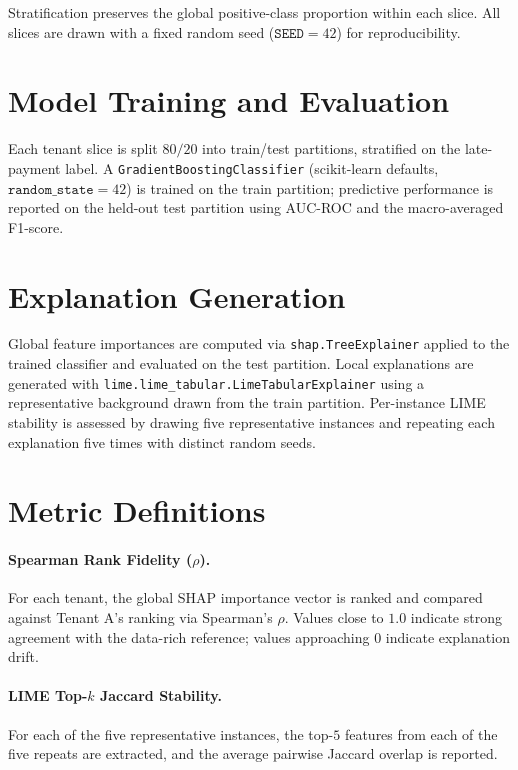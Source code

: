 Stratification preserves the global positive-class proportion within each slice. All slices are drawn with a fixed random seed ($\mathtt{SEED} = 42$) for reproducibility.

\section{Model Training and Evaluation}
\label{sec:methodology_training}

Each tenant slice is split $80/20$ into train/test partitions, stratified on the late-payment label. A \texttt{GradientBoostingClassifier} (scikit-learn defaults, $\mathtt{random\_state}=42$) is trained on the train partition; predictive performance is reported on the held-out test partition using AUC-ROC and the macro-averaged F1-score.

\section{Explanation Generation}
\label{sec:methodology_explanation}

Global feature importances are computed via \texttt{shap.TreeExplainer} applied to the trained classifier and evaluated on the test partition. Local explanations are generated with \texttt{lime.lime\_tabular.LimeTabularExplainer} using a representative background drawn from the train partition. Per-instance LIME stability is assessed by drawing five representative instances and repeating each explanation five times with distinct random seeds.

\section{Metric Definitions}
\label{sec:methodology_metrics}

\paragraph{Spearman Rank Fidelity ($\rho$).} For each tenant, the global SHAP importance vector is ranked and compared against Tenant A's ranking via Spearman's $\rho$. Values close to $1.0$ indicate strong agreement with the data-rich reference; values approaching $0$ indicate explanation drift.

\paragraph{LIME Top-$k$ Jaccard Stability.} For each of the five representative instances, the top-$5$ features from each of the five repeats are extracted, and the average pairwise Jaccard overlap is reported.

